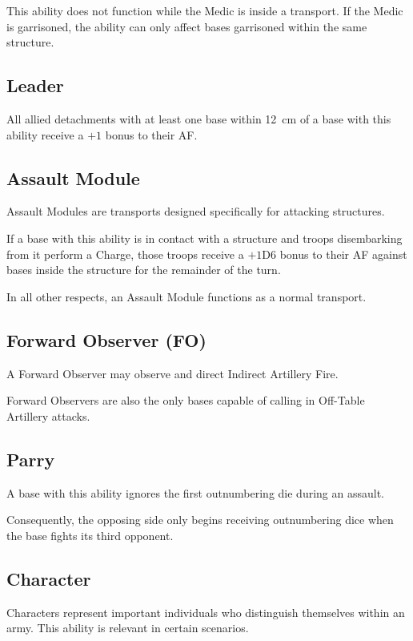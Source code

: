 This ability does not function while the Medic is inside a transport. If the Medic is garrisoned, the ability can only affect bases garrisoned within the same structure.

\subsection{Leader}

All allied detachments with at least one base within 12~cm of a base with this ability receive a $+1$ bonus to their AF.

\subsection{Assault Module}

Assault Modules are transports designed specifically for attacking structures.

If a base with this ability is in contact with a structure and troops disembarking from it perform a Charge, those troops receive a $+1$D6 bonus to their AF against bases inside the structure for the remainder of the turn.

In all other respects, an Assault Module functions as a normal transport.

\subsection{Forward Observer (FO)}

A Forward Observer may observe and direct Indirect Artillery Fire.

Forward Observers are also the only bases capable of calling in Off-Table Artillery attacks.

\subsection{Parry}

A base with this ability ignores the first outnumbering die during an assault.

Consequently, the opposing side only begins receiving outnumbering dice when the base fights its third opponent.

\subsection{Character}

Characters represent important individuals who distinguish themselves within an army. This ability is relevant in certain scenarios.

